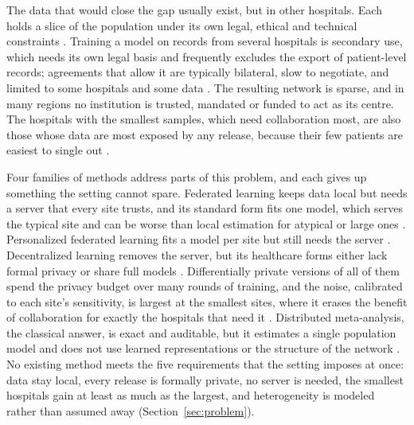 \documentclass[acmsmall,screen,review]{acmart}
\theoremstyle{acmdefinition}
\begin{document}
The data that would close the gap usually exist, but in other hospitals. Each holds a slice of the population under its own legal, ethical and technical constraints \cite{cohen2018hipaa,gdpr2016,price2019privacy}. Training a model on records from several hospitals is secondary use, which needs its own legal basis and frequently excludes the export of patient-level records; agreements that allow it are typically bilateral, slow to negotiate, and limited to some hospitals and some data \cite{ehds2025}. The resulting network is sparse, and in many regions no institution is trusted, mandated or funded to act as its centre. The hospitals with the smallest samples, which need collaboration most, are also those whose data are most exposed by any release, because their few patients are easiest to single out \cite{rocher2019estimating}.

Four families of methods address parts of this problem, and each gives up something the setting cannot spare. Federated learning keeps data local but needs a server that every site trusts, and its standard form fits one model, which serves the typical site and can be worse than local estimation for atypical or large ones \cite{hsieh2020non,mcmahan2017communication}. Personalized federated learning fits a model per site but still needs the server \cite{collins2021exploiting,li2021ditto}. Decentralized learning removes the server, but its healthcare forms either lack formal privacy or share full models \cite{kalra2023decentralized,warnatherresthal2021swarm}. Differentially private versions of all of them spend the privacy budget over many rounds of training, and the noise, calibrated to each site's sensitivity, is largest at the smallest sites, where it erases the benefit of collaboration for exactly the hospitals that need it \cite{bagdasaryan2019differential,mcmahan2018learning}. Distributed meta-analysis, the classical answer, is exact and auditable, but it estimates a single population model and does not use learned representations or the structure of the network \cite{dersimonian1986meta,duan2020learning}. No existing method meets the five requirements that the setting imposes at once: data stay local, every release is formally private, no server is needed, the smallest hospitals gain at least as much as the largest, and heterogeneity is modeled rather than assumed away (Section~\ref{sec:problem}).
\end{document}
